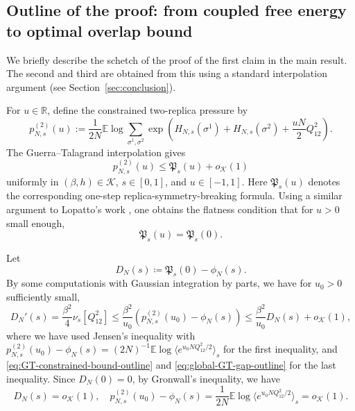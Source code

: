 \documentclass[11pt]{article}
\numberwithin{equation}{section}
\newcommand{\E}{\mathbb{E}}
\newcommand{\1}{\mathbf 1}
\newcommand{\cK}{\mathcal K}
\begin{document}
\subsection{Outline of the proof: from coupled free energy to optimal overlap bound}
\label{subsec:proof-outline}

We briefly describe the schetch of the proof of the first claim in the main result.
The second and third are obtained from this using a standard interpolation argument (see Section~\ref{sec:conclusion}).

For $u \in \mathbb R$, define the constrained
two-replica pressure by
\begin{equation}
 p^{(2)}_{N,s}(u )
  :=
 \frac1{2N}\E\log
 \sum_{\sigma^1,\sigma^2}
 \exp\left(
 H_{N,s}(\sigma^1)+H_{N,s}(\sigma^2)
 +\frac{u  N}{2}Q_{12}^2\right).
\label{eq:constrained-two-replica-pressure}
\end{equation}
The Guerra--Talagrand interpolation gives
\begin{equation}
p_{N,s}^{(2)}(u )
\le
\mathfrak P_s(u )+ o_\cK(1)
\label{eq:GT-constrained-bound-outline}
\end{equation}
uniformly in $(\beta,h)\in\mathcal K$, $s\in[0,1]$, and
$u\in[-1,1]$. Here $\mathfrak P_s(u )$ denotes the
corresponding one-step replica-symmetry-breaking formula. Using a similar argument to Lopatto's work \cite{Lopatto}, one obtains the flatness condition that for $u>0$ small enough,
 \begin{equation}
\mathfrak P_s(u )
= \mathfrak P_s(0). %
\label{eq:global-GT-gap-outline}
\end{equation}

Let \begin{equation*}
 D_N(s)\coloneqq \mathfrak P_s(0)-\phi_N(s).
\end{equation*} 
By some computationis with Gaussian integration by parts, we have for $u_0>0$ sufficiently small,  
\[
D_N'(s) =  \frac{\beta^2}{4} \nu_s [Q_{12}^2]  \leq \frac{\beta^2}{u_0} ({p_{N,s}^{(2)}(u_0)-\phi_N(s)}) \leq   \frac{\beta^2}{u_0} D_N(s) +  o_\cK(1),
\]
where we have used Jensen's inequality with $p_{N,s}^{(2)}(u_0)-\phi_N(s)= (2N)^{-1}\mathbb E\log \langle e^{u_0 N Q_{12}^2/2} \rangle_s$ for the first inequality, and \eqref{eq:GT-constrained-bound-outline} and \eqref{eq:global-GT-gap-outline} for the last inequality. Since $D_N(0) = 0$, by Gronwall's inequality, we have
$$D_N(s) = o_\cK(1),\quad  p_{N,s}^{(2)}(u_0)-\phi_N(s)= \frac{1}{2N}\mathbb E\log \langle e^{u_0 N Q_{12}^2/2} \rangle_s = o_\cK(1).$$ 
\end{document}

